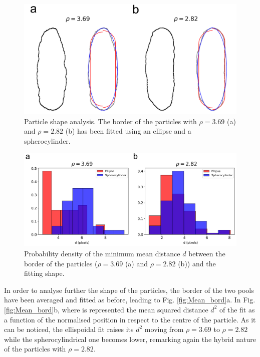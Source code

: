 \documentclass{article}
\begin{document}
\begin{figure}
    \centering
    \includegraphics[width=1\columnwidth]{Part fit.png}
    \caption{Particle shape analysis. The border of the particles with $\rho = 3.69$ (a) and $\rho = 2.82$ (b) has been fitted using an ellipse and a spherocylinder.}
    \label{fig:Part_fit}
\end{figure}


\begin{figure}
    \centering
    \includegraphics[width=1\columnwidth]{Mean_dist.png}
    \caption{Probability density of the minimum mean distance $d$ between the border of the particles ($\rho = 3.69$ (a) and $\rho = 2.82$ (b)) and the fitting shape.}
    \label{fig:Mean_dist}
\end{figure}

In order to analyse further the shape of the particles, the border of the two pools have been averaged and fitted as before, leading to Fig. \ref{fig:Mean_bord}a. In Fig. \ref{fig:Mean_bord}b, where is represented the mean squared distance $d^2$ of the fit as a function of the normalised position in respect to the centre of the particle. As it can be noticed, the ellispoidal fit raises its $d^2$ moving from $\rho=3.69$ to $\rho=2.82$ while the spherocylindrical one becomes lower, remarking again the hybrid nature of the particles with $\rho=2.82$.
\end{document}
